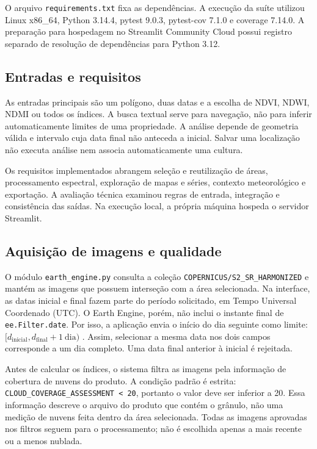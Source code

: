O arquivo \texttt{requirements.txt} fixa as dependências. A execução da suíte utilizou Linux x86\_64, Python 3.14.4, pytest 9.0.3, pytest-cov 7.1.0 e coverage 7.14.0. A preparação para hospedagem no Streamlit Community Cloud possui registro separado de resolução de dependências para Python 3.12.

\subsection{Entradas e requisitos}

As entradas principais são um polígono, duas datas e a escolha de NDVI, NDWI, NDMI ou todos os índices. A busca textual serve para navegação, não para inferir automaticamente limites de uma propriedade. A análise depende de geometria válida e intervalo cuja data final não anteceda a inicial. Salvar uma localização não executa análise nem associa automaticamente uma cultura.

Os requisitos implementados abrangem seleção e reutilização de áreas, processamento espectral, exploração de mapas e séries, contexto meteorológico e exportação. A avaliação técnica examinou regras de entrada, integração e consistência das saídas. Na execução local, a própria máquina hospeda o servidor Streamlit.

\subsection{Aquisição de imagens e qualidade}

O módulo \texttt{earth\_engine.py} consulta a coleção \texttt{COPERNICUS/S2\_SR\_HARMONIZED} e mantém as imagens que possuem interseção com a área selecionada. Na interface, as datas inicial e final fazem parte do período solicitado, em Tempo Universal Coordenado (UTC). O Earth Engine, porém, não inclui o instante final de \texttt{ee.Filter.date}. Por isso, a aplicação envia o início do dia seguinte como limite: $[d_{\mathrm{inicial}},d_{\mathrm{final}}+1\ \mathrm{dia})$ \citep{GOOGLE_EE_DATE}. Assim, selecionar a mesma data nos dois campos corresponde a um dia completo. Uma data final anterior à inicial é rejeitada.

Antes de calcular os índices, o sistema filtra as imagens pela informação de cobertura de nuvens do produto. A condição padrão é estrita: \texttt{CLOUD\_COVERAGE\_ASSESSMENT < 20}, portanto o valor deve ser inferior a 20. Essa informação descreve o arquivo do produto que contém o grânulo, não uma medição de nuvens feita dentro da área selecionada. Todas as imagens aprovadas nos filtros seguem para o processamento; não é escolhida apenas a mais recente ou a menos nublada.

